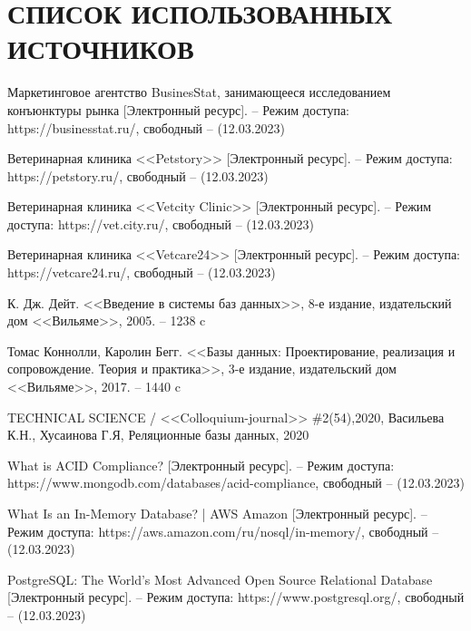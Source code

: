 \section*{СПИСОК ИСПОЛЬЗОВАННЫХ ИСТОЧНИКОВ}

\begingroup
\renewcommand{\section}[2]{}
\begin{thebibliography}{}
	
		Маркетинговое агентство  BusinesStat, занимающееся исследованием конъюнктуры рынка [Электронный ресурс]. -- Режим доступа: 
		https://businesstat.ru/,
		свободный -- (12.03.2023)
		
		Ветеринарная клиника <<Petstory>> [Электронный ресурс]. -- Режим доступа:  https://petstory.ru/,
		свободный -- (12.03.2023)
		
		Ветеринарная клиника <<Vetcity Clinic>> [Электронный ресурс]. -- Режим доступа:  https://vet.city.ru/,
		свободный -- (12.03.2023)
		
		Ветеринарная клиника <<Vetcare24>> [Электронный ресурс]. -- Режим доступа: https://vetcare24.ru/,
		свободный -- (12.03.2023)
			
		К. Дж. Дейт.
		<<Введение в системы баз данных>>, 8-е издание, издательский дом <<Вильяме>>,
		2005. -- 1238 c 
		
		Томас Коннолли, Каролин Бегг.
		<<Базы данных: Проектирование, реализация и сопровождение. Теория и практика>>, 3-е издание, издательский дом <<Вильяме>>,
		2017. -- 1440 c
		
		TECHNICAL SCIENCE / <<Colloquium-journal>> \#2(54),2020,
		Васильева К.Н., Хусаинова Г.Я,
		Реляционные базы данных,
		2020

		What is ACID Compliance? [Электронный ресурс]. -- Режим доступа: 	https://www.mongodb.com/databases/acid-compliance,
		свободный -- (12.03.2023)
		
		What Is an In-Memory Database? | AWS Amazon [Электронный ресурс]. -- Режим доступа: https://aws.amazon.com/ru/nosql/in-memory/,
		свободный -- (12.03.2023)
		
		PostgreSQL: The World's Most Advanced Open Source Relational Database  [Электронный ресурс]. -- Режим доступа: https://www.postgresql.org/,
		свободный -- (12.03.2023)
		
		
	

\end{thebibliography}
\endgroup

\pagebreak